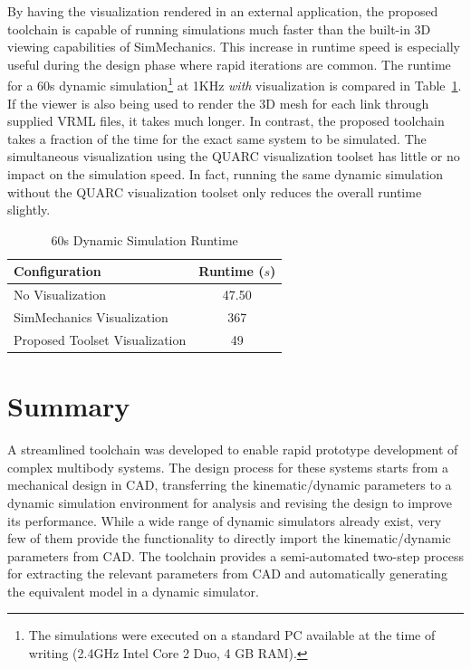 By having the visualization rendered in an external application, the proposed toolchain is capable of running simulations much faster than the built-in 3D viewing capabilities of SimMechanics. This increase in runtime speed is especially useful during the design phase where rapid iterations are common. The runtime for a 60s dynamic simulation\footnote{The simulations were executed on a standard PC available at the time of writing (2.4GHz Intel Core 2 Duo, 4 GB RAM).} at 1KHz \emph{with} visualization is compared in Table~\ref{tab:benchmark}. If the viewer is also being used to render the 3D mesh for each link through supplied VRML files, it takes much longer. In contrast, the proposed toolchain takes a fraction of the time for the exact same system to be simulated. The simultaneous visualization using the QUARC visualization toolset has little or no impact on the simulation speed. In fact, running the same dynamic simulation without the QUARC visualization toolset only reduces the overall runtime slightly.

\begin{table}[!h]
  \centering
  \caption{60s Dynamic Simulation Runtime}
    \begin{tabular}{lc}
    \addlinespace
    \toprule
    \textbf{Configuration} & \textbf{Runtime ($s$)}\\
    \midrule
    No Visualization 				& 47.50 	\\
    SimMechanics Visualization    	& 367	 	\\
    Proposed Toolset Visualization 	& 49 		\\
    \bottomrule
    \end{tabular}
  \label{tab:benchmark}
\end{table}



\section{Summary} %
\label{sec:toolchain_summary}
A streamlined toolchain was developed to enable rapid prototype development of complex multibody systems. The design process for these systems starts from a mechanical design in CAD, transferring the kinematic/dynamic parameters to a dynamic simulation environment for analysis and revising the design to improve its performance. While a wide range of dynamic simulators already exist, very few of them provide the functionality to directly  import the kinematic/dynamic parameters from CAD. The toolchain provides a semi-automated two-step process for extracting the relevant parameters from CAD and automatically generating the equivalent model in a dynamic simulator. 

